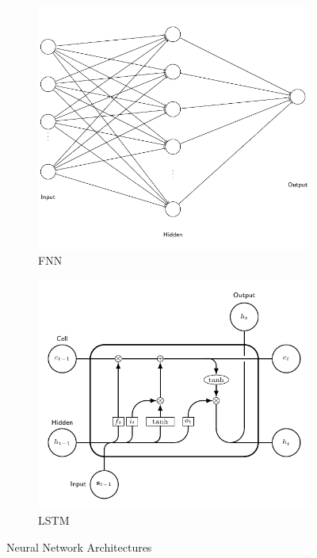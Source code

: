 \begin{figure}[ht!]
    \centering
    \begin{subfigure}{0.45\textwidth}
        \includegraphics[width=\textwidth]{./project3/tikz/fnn.pdf}
        \caption{FNN}
        \label{subfig:fnn}
    \end{subfigure}
    \hspace{1cm}
    \begin{subfigure}{0.45\textwidth}
        \includegraphics[width=\textwidth]{./project3/tikz/lstm.pdf}
        \caption{LSTM}
        \label{subfig:lstm}
    \end{subfigure}
    \caption{Neural Network Architectures}
    \label{fig:nn}
\end{figure}


